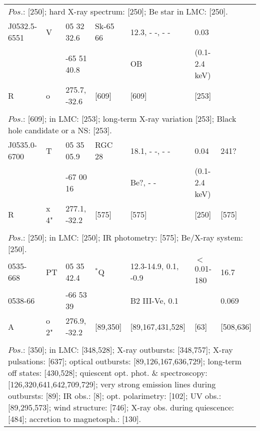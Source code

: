 \documentclass{aa}
\begin{document}
\begin{table*}[h]
\begin{tabular}{p{2.5cm}p{1cm}p{1.8cm}p{2.3cm}p{3.3cm}p{2.0cm}p{2.2cm}}
\\
\multicolumn{7}{p{17.5cm}}{
$Pos$.: [250]; hard X-ray spectrum: [250]; Be star in LMC: [250].   }\\

\noalign{\smallskip}
\hline
\noalign{\smallskip}
J0532.5-6551    &    V     &  05 32 32.6    &    Sk-65 66    &   12.3, - -, - -  &     0.03             &   \\      
                             &           & -65 51 40.8    &                         &  OB               & (0.1-2.4 keV)   &    \\     
R                          &     o    & 275.7, -32.6   &  [609]            &     [609]          &              [253]        &  \\        
  
\\
\multicolumn{7}{p{17.5cm}}{
$Pos$.: [609]; in LMC: [253]; long-term X-ray variation [253]; Black hole candidate or a NS: [253].    }\\

\noalign{\smallskip}
\hline
\noalign{\smallskip}
J0535.0-6700    &   T          &   05 35 05.9     &  RGC 28  &   18.1, - -, - -     & 0.04               &   241?  \\
                             &               &   -67 00 16       &                   &  Be?, - -      &  (0.1-2.4 keV)     &                   \\                    
     R                     & x 4"       & 277.1, -32.2     &  [575]      &   [575]        &   [250]                    &        [575]  \\
  
\\
\multicolumn{7}{p{17.5cm}}{
$Pos$.: [250]; in LMC: [250]; IR photometry: [575]; Be/X-ray system: [250].                  }\\

\noalign{\smallskip}
\hline
\noalign{\smallskip}
 0535-668  &   PT  & 05 35 42.4     & $^*$Q        & 12.3-14.9, 0.1, -0.9    & $<$0.01-180  &  16.7         \\
  0538-66   &           & -66 53 39      &                     & B2 III-Ve, 0.1             &                         &  0.069        \\
    A             &  o 2" & 276.9, -32.2   & [89,350]  & [89,167,431,528]     &  [63]               & [508,636]    \\
\\
\multicolumn{7}{p{17.5cm}}{
$Pos$.: [350]; in LMC: [348,528]; X-ray outbursts: [348,757]; X-ray pulsations: [637]; optical outbursts: 
[89,126,167,636,729]; long-term off states: [430,528]; quiescent opt. phot. \& spectroscopy: [126,320,641,642,709,729]; 
very strong emission lines during outbursts: [89]; IR obs.: [8]; opt. polarimetry: [102]; UV obs.: 
[89,295,573]; wind structure: [746]; X-ray obs. during quiescence: [484]; accretion to magnetosph.: [130].}\\


\end{tabular}
\end{table*}
\end{document}
